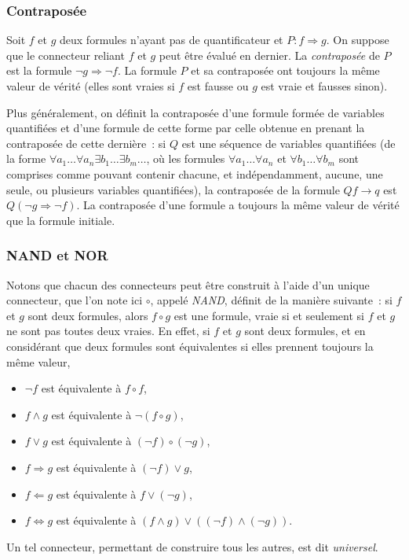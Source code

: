 \subsubsection{Contraposée}

Soit $f$ et $g$ deux formules n'ayant pas de quantificateur et $P: f \Rightarrow g$. 
On suppose que le connecteur reliant $f$ et $g$ peut être évalué en dernier.
La \textit{contraposée} de $P$ est la formule $\neg g \Rightarrow \neg f$. 
La formule $P$ et sa contraposée ont toujours la même valeur de vérité (elles sont vraies si $f$ est fausse ou $g$ est vraie et fausses sinon). 

Plus généralement, on définit la contraposée d'une formule formée de variables quantifiées et d'une formule de cette forme par celle obtenue en prenant la contraposée de cette dernière : si $Q$ est une séquence de variables quantifiées (de la forme $\forall a_1 \dots \forall a_n \exists b_1 \dots \exists b_m \dots$, où les formules $\forall a_1 \dots \forall a_n$ et $\forall b_1 \dots \forall b_m$ sont comprises comme pouvant contenir chacune, et indépendamment, aucune, une seule, ou plusieurs variables quantifiées), la contraposée de la formule $Q f \rightarrow q$ est $Q (\neg g \Rightarrow \neg f)$. 
La contraposée d'une formule a toujours la même valeur de vérité que la formule initiale.

\subsubsection{NAND et NOR}

Notons que chacun des connecteurs peut être construit à l'aide d'un unique connecteur, que l'on  note ici $\circ$, appelé \textit{NAND}, définit de la manière suivante : si $f$ et $g$ sont deux formules, alors $f \circ g$ est une formule, vraie si et seulement si $f$ et $g$ ne sont pas toutes deux vraies. 
En effet, si $f$ et $g$ sont deux formules, et en considérant que deux formules sont équivalentes si elles prennent toujours la même valeur,
\begin{itemize}
    \item $\neg f$ est équivalente à $f \circ f$,
    \item $f \wedge g$ est équivalente à $\neg (f \circ g)$,
    \item $f \vee g$ est équivalente à $(\neg f) \circ (\neg g)$,
    \item $f \Rightarrow g$ est équivalente à $(\neg f) \vee g$,
    \item $f \Leftarrow g$ est équivalente à $f \vee (\neg g)$,
    \item $f \Leftrightarrow g$ est équivalente à $(f \wedge g) \vee ((\neg f) \wedge (\neg g))$.
\end{itemize}
Un tel connecteur, permettant de construire tous les autres, est dit \textit{universel}.

